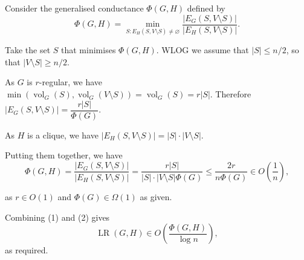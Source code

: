 \documentclass[12pt]{article}
\DeclareMathOperator{\vol}{vol}
\DeclareMathOperator{\LR}{LR}
\begin{document}
\begin{enumerate}[label=\alph*., font=\bfseries]
Consider the generalised conductance $\Phi(G,H)$ defined by
\[\Phi(G,H)=\min_{S:E_H(S,V\setminus S)\ne\varnothing}\dfrac{|E_G(S,V\setminus S)|}{|E_H(S,V\setminus S)|}.\]

Take the set $S$ that minimises $\Phi(G,H)$. WLOG we assume that $|S|\le n/2$, so that $|V\setminus S|\ge n/2$.

As $G$ is $r$-regular, we have $\min(\vol_G(S), \vol_{G}(V\setminus S))=\vol_G(S)=r|S|$. Therefore $|E_G(S,V\setminus S)|=\dfrac{r|S|}{\Phi(G)}$.

As $H$ is a clique, we have $|E_H(S,V\setminus S)|=|S|\cdot|V\setminus S|$.

Putting them together, we have
\begin{equation}
\Phi(G, H)=\dfrac{|E_G(S,V\setminus S)|}{|E_H(S,V\setminus S)|}=\dfrac{r|S|}{|S|\cdot|V\setminus S|\Phi(G)}\le\dfrac{2r}{n\Phi(G)}\in O\left(\dfrac{1}{n}\right),
\end{equation}

as $r\in O(1)$ and $\Phi(G)\in\Omega(1)$ as given.

Combining (1) and (2) gives
$$\LR(G,H)\in O\left(\dfrac{\Phi(G, H)}{\log n}\right),$$
as required.
\end{enumerate}
\end{document}
